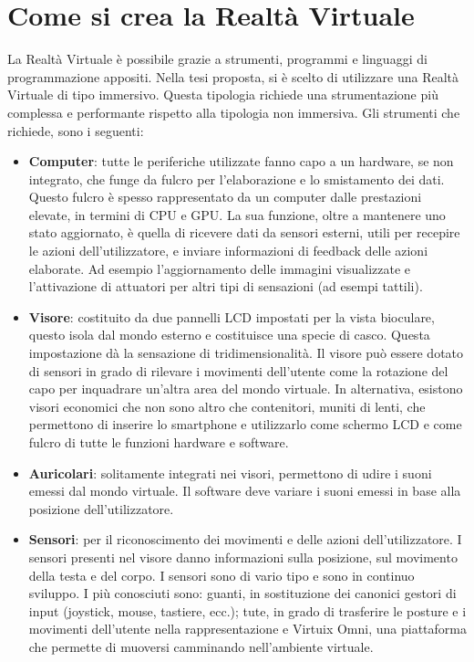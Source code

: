 \section{Come si crea la Realtà Virtuale}
La Realtà Virtuale è possibile grazie a strumenti, programmi e linguaggi di programmazione appositi. Nella tesi proposta, si è scelto di utilizzare una Realtà Virtuale di tipo immersivo. Questa tipologia richiede una strumentazione più complessa e performante rispetto alla tipologia non immersiva. Gli strumenti che richiede, sono i seguenti:
\begin{itemize}
  \item \textbf{Computer}: tutte le periferiche utilizzate fanno capo a un hardware, se non integrato, che funge da fulcro per l’elaborazione e lo smistamento dei dati. Questo fulcro è spesso rappresentato da un computer dalle prestazioni elevate, in termini di CPU e GPU. La sua funzione, oltre a mantenere uno stato aggiornato, è quella di ricevere dati da sensori esterni, utili per recepire le azioni dell’utilizzatore, e inviare informazioni di feedback delle azioni elaborate. Ad esempio l’aggiornamento delle immagini visualizzate e l’attivazione di attuatori per altri tipi di sensazioni (ad esempi tattili).
	\item\textbf{Visore}: costituito da due pannelli LCD impostati per la vista bioculare, questo isola dal mondo esterno e costituisce una specie di casco. Questa impostazione dà la sensazione di tridimensionalità. Il visore può essere dotato di sensori in grado di rilevare i movimenti dell’utente come la rotazione del capo per inquadrare un’altra area del mondo virtuale. In alternativa, esistono visori economici che non sono altro che contenitori, muniti di lenti, che permettono di inserire lo smartphone e utilizzarlo come schermo LCD e come fulcro di tutte le funzioni hardware e software.
  \item \textbf{Auricolari}: solitamente integrati nei visori, permettono di udire i suoni emessi dal mondo virtuale. Il software deve variare i suoni emessi in base alla posizione dell'utilizzatore.
  \item \textbf{Sensori}: per il riconoscimento dei movimenti e delle azioni dell'utilizzatore. I sensori presenti nel visore danno informazioni sulla posizione, sul movimento della testa e del corpo. I sensori sono di vario tipo e sono in continuo sviluppo. I più conosciuti sono: guanti, in sostituzione dei canonici gestori di input (joystick, mouse, tastiere, ecc.); tute, in grado di trasferire le posture e i movimenti dell’utente nella rappresentazione e Virtuix Omni, una piattaforma che permette di muoversi camminando nell’ambiente virtuale.
\end{itemize}






















%